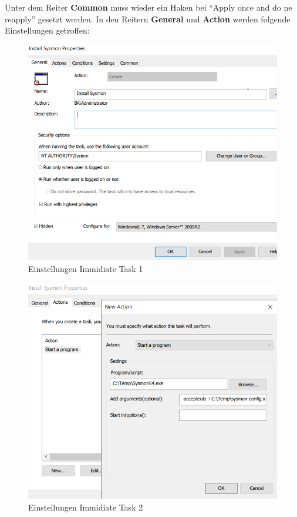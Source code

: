 Unter dem Reiter \textbf{Common} muss wieder ein Haken bei ``Apply once and do ne reapply'' gesetzt werden.
In den Reitern \textbf{General} und \textbf{Action} werden folgende Einstellungen getroffen:\\
\begin{minipage}{0.5\linewidth}
    \begin{figure}[H]
        \centering
        \includegraphics[width=\linewidth]{../img/sysmon/scheduled-task-general.png}
        \caption{Einstellungen Immidiate Task 1}
    \end{figure}

\end{minipage}
\begin{minipage}{0.5\linewidth}
    \begin{figure}[H]
        \centering
        \includegraphics[width=\linewidth]{../img/sysmon/scheduled-task-action.png}
        \caption{Einstellungen Immidiate Task 2}
    \end{figure}
\end{minipage}\\

